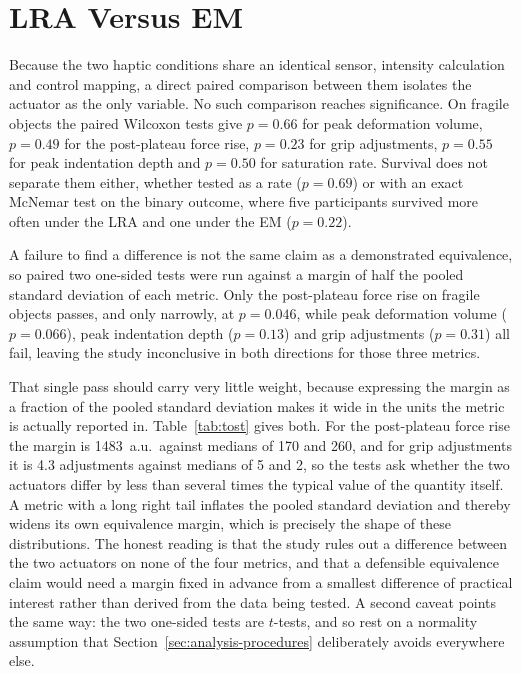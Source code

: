 \documentclass[12pt, a4paper, twoside, openright]{report}
\begin{document}
\section{LRA Versus EM}
\label{sec:lra-vs-em}

Because the two haptic conditions share an identical sensor, intensity
calculation and control mapping, a direct paired comparison between them
isolates the actuator as the only variable. No such comparison reaches
significance. On fragile objects the paired Wilcoxon tests give $p = 0.66$ for
peak deformation volume, $p = 0.49$ for the post-plateau force rise,
$p = 0.23$ for grip adjustments, $p = 0.55$ for peak indentation depth and
$p = 0.50$ for saturation rate. Survival does not separate them either, whether
tested as a rate ($p = 0.69$) or with an exact McNemar test on the binary
outcome, where five participants survived more often under the LRA and one
under the EM ($p = 0.22$).

A failure to find a difference is not the same claim as a demonstrated
equivalence, so paired two one-sided tests were run against a margin of half
the pooled standard deviation of each metric. Only the post-plateau force rise
on fragile objects passes, and only narrowly, at $p = 0.046$, while peak
deformation volume ($p = 0.066$), peak indentation depth ($p = 0.13$) and grip
adjustments ($p = 0.31$) all fail, leaving the study inconclusive in both
directions for those three metrics.

That single pass should carry very little weight, because expressing the margin
as a fraction of the pooled standard deviation makes it wide in the units the
metric is actually reported in. Table~\ref{tab:tost} gives both. For the
post-plateau force rise the margin is 1483~a.u.\ against medians of 170 and
260, and for grip adjustments it is 4.3 adjustments against medians of 5 and 2,
so the tests ask whether the two actuators differ by less than several times the
typical value of the quantity itself. A metric with a long right tail inflates
the pooled standard deviation and thereby widens its own equivalence margin,
which is precisely the shape of these distributions. The honest reading is that
the study rules out a difference between the two actuators on none of the four
metrics, and that a defensible equivalence claim would need a margin fixed in
advance from a smallest difference of practical interest rather than derived
from the data being tested. A second caveat points the same way: the two
one-sided tests are $t$-tests, and so rest on a normality assumption that
Section~\ref{sec:analysis-procedures} deliberately avoids everywhere else.
\end{document}
